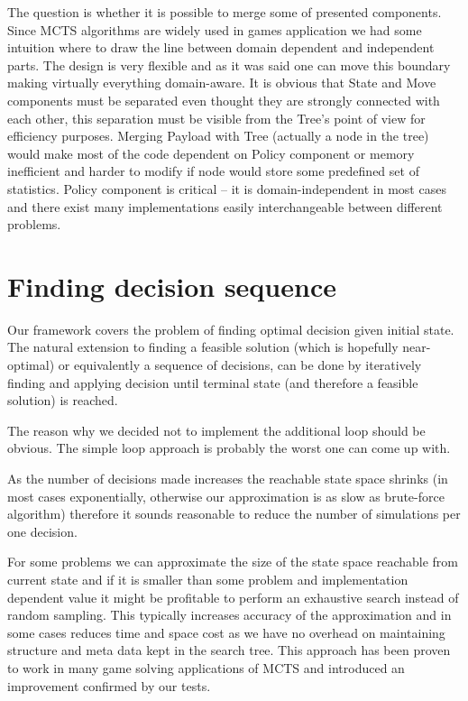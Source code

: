 The question is whether it is possible to merge some of presented components.
Since MCTS algorithms are widely used in games application we had some
intuition where to draw the line between domain dependent and independent
parts. The design is very flexible and as it was said one can move this
boundary making virtually everything domain-aware. It is obvious that State
and Move components must be separated even thought they are strongly connected
with each other, this separation must be visible from the Tree's point of view
for efficiency purposes.
Merging Payload with Tree (actually a node in the tree) would make most of the
code dependent on Policy component or memory inefficient and harder to modify
if node would store some predefined set of statistics.
Policy component is critical -- it is domain-independent in most cases and
there exist many implementations easily interchangeable between different
problems.

\section{Finding decision sequence}
Our framework covers the problem of finding optimal decision given initial
state. The natural extension to finding a feasible solution (which is hopefully
near-optimal) or equivalently a sequence of decisions, can be done by
iteratively finding and applying decision until terminal state (and therefore a
feasible solution) is reached.

The reason why we decided not to implement the additional loop should be
obvious. The simple loop approach is probably the worst one can come up with.

As the number of decisions made increases the reachable state space shrinks (in
most cases exponentially, otherwise our approximation is as slow as brute-force
algorithm) therefore it sounds reasonable to reduce the number of simulations
per one decision.

For some problems we can approximate the size of the state space reachable from
current state and if it is smaller than some problem and implementation
dependent value it might be profitable to perform an exhaustive search instead
of random sampling. This typically increases accuracy of the approximation and
in some cases reduces time and space cost as we have no overhead on maintaining
structure and meta data kept in the search tree. This approach has been proven
to work in many game solving applications of MCTS and introduced an improvement
confirmed by our tests.

